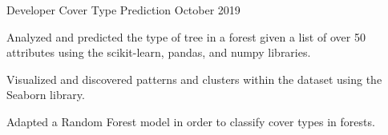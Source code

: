 \begin{cventries}
\cvproject
{Developer} %
{Cover Type Prediction} %
{} %
{October 2019} %
{ %
\begin{cvitems}
\item Analyzed and predicted the type of tree in a forest given a list of over 50 attributes
using the scikit-learn, pandas, and numpy libraries.
\item Visualized and discovered patterns and clusters within the dataset using the Seaborn library.
\item Adapted a Random Forest model in order to classify cover types in forests.
\end{cvitems}
}




\end{cventries}
